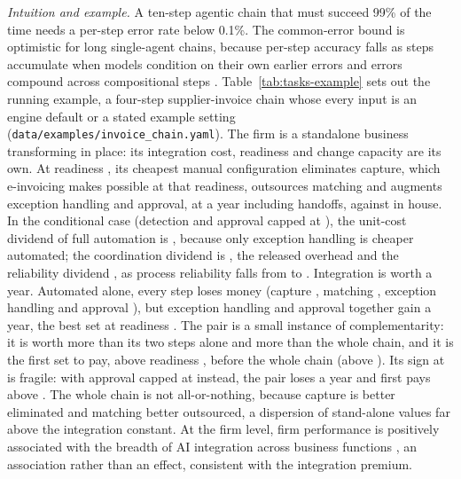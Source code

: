 \noindent\emph{Intuition and example.} A ten-step agentic chain that must succeed 99\% of the time needs a per-step error rate below 0.1\%. The common-error bound is optimistic for long single-agent chains, because per-step accuracy falls as steps accumulate when models condition on their own earlier errors \citep{sinha2025illusion} and errors compound across compositional steps \citep{dziri2023faith}. Table~\ref{tab:tasks-example} sets out the running example, a four-step supplier-invoice chain whose every input is an engine default or a stated example setting (\texttt{data/examples/invoice\_chain.yaml}). The firm is a standalone business transforming in place: its integration cost, readiness and change capacity are its own. At readiness \icIotaHigh, its cheapest manual configuration eliminates capture, which e-invoicing makes possible at that readiness, outsources matching and augments exception handling and approval, at \icCmanHigh{} a year including handoffs, against \icEinhouse{} in house. In the conditional case (detection \icDill{} and approval capped at \icQcap), the unit-cost dividend of full automation is \icDivUnit, because only exception handling is cheaper automated; the coordination dividend is \icDivCoord, the released overhead \icDivOver{} and the reliability dividend \icDivRel, as process reliability falls from \icQM{} to \icQA. Integration is worth \icWfullHigh{} a year. Automated alone, every step loses money (capture \icSingleCapture, matching \icSingleMatch, exception handling \icSingleExc{} and approval \icSingleAppr), but exception handling and approval together gain \icPairEA{} a year, the best set at readiness \icIotaHigh. The pair is a small instance of complementarity: it is worth more than its two steps alone and more than the whole chain, and it is the first set to pay, above readiness \icBestFirstIota, before the whole chain (above \icIotaStarN). Its sign at \icIotaHigh{} is fragile: with approval capped at \icQstar{} instead, the pair loses \icAltPairLoss{} a year and first pays above \icAltFirstIota. The whole chain is not all-or-nothing, because capture is better eliminated and matching better outsourced, a dispersion of stand-alone values far above the integration constant. At the firm level, firm performance is positively associated with the breadth of AI integration across business functions \citep{bonney2026microstructure}, an association rather than an effect, consistent with the integration premium.


